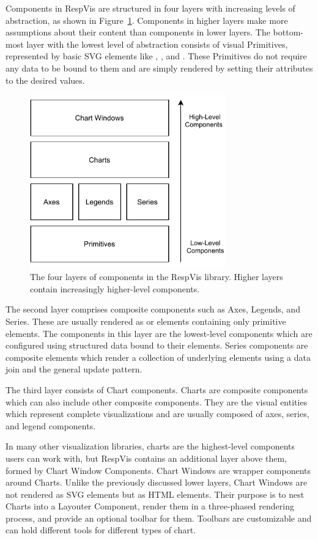 Components in RespVis are structured in four layers with increasing
levels of abstraction, as shown in Figure~\ref{fig:Layers}. Components
in higher layers make more assumptions about their content than
components in lower layers. The bottom-most layer with the lowest
level of abstraction consists of visual Primitives, represented by
basic SVG elements like , , and
. These Primitives do not require any data to be bound to
them and are simply rendered by setting their attributes to the
desired values.


\begin{figure}[tp]
\centering
\includegraphics[keepaspectratio,width=\linewidth,height=7.5cm]
{diagrams/respvis-layers.pdf}
\caption[Component Layers of RespVis]{
The four layers of components in the RespVis library. Higher layers
contain increasingly higher-level components.
}
\label{fig:Layers}
\end{figure}


The second layer comprises composite components such as Axes, Legends,
and Series. These are usually rendered as  or 
elements containing only primitive elements. The components in this
layer are the lowest-level components which are configured using
structured data bound to their elements. Series components are
composite elements which render a collection of underlying elements
using a data join and the general update pattern.

The third layer consists of Chart components. Charts are composite
components which can also include other composite components. They are
the visual entities which represent complete visualizations and are
usually composed of axes, series, and legend components.

In many other visualization libraries, charts are the highest-level
components users can work with, but RespVis contains an additional
layer above them, formed by Chart Window Components. Chart Windows are
wrapper components around Charts. Unlike the previously discussed
lower layers, Chart Windows are not rendered as SVG elements but as
HTML  elements. Their purpose is to nest Charts into a
Layouter Component, render them in a three-phased rendering process,
and provide an optional toolbar for them. Toolbars are customizable
and can hold different tools for different types of chart.







